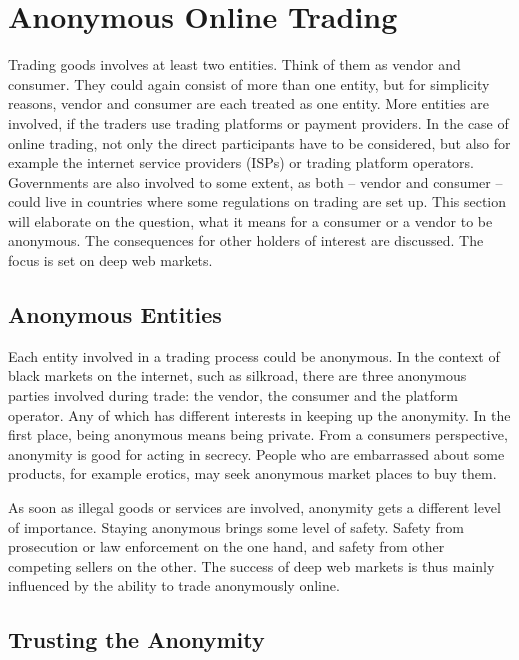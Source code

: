 \section{Anonymous Online Trading}
\label{trading}

Trading goods involves at least two entities. Think of them as vendor and consumer. They could again consist of more than one entity, but for simplicity reasons, vendor and consumer are each treated as one entity. More entities are involved, if the traders use trading platforms or payment providers. In the case of online trading, not only the direct participants have to be considered, but also for example the internet service providers (ISPs) or trading platform operators. Governments are also involved to some extent, as both -- vendor and consumer -- could live in countries where some regulations on trading are set up.
This section will elaborate on the question, what it means for a consumer or a vendor to be anonymous. The consequences for other holders of interest are discussed. The focus is set on deep web markets.

\subsection{Anonymous Entities}

Each entity involved in a trading process could be anonymous. In the context of black markets on the internet, such as silkroad\cite{silkroad2013}, there are three anonymous parties involved during trade: the vendor, the consumer and the platform operator. Any of which has different interests in keeping up the anonymity. In the first place, being anonymous means being private. From a consumers perspective, anonymity is good for acting in secrecy. People who are embarrassed about some products, for example erotics, may seek anonymous market places to buy them.

As soon as illegal goods or services are involved, anonymity gets a different level of importance. Staying anonymous brings some level of safety. Safety from prosecution or law enforcement on the one hand, and safety from other competing sellers on the other. The success of deep web markets is thus mainly influenced by the ability to trade anonymously online.


\subsection{Trusting the Anonymity}

